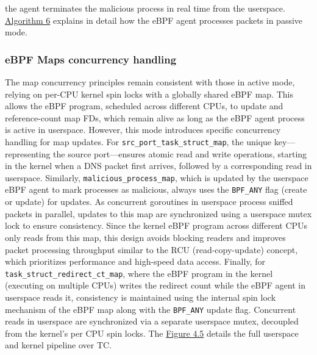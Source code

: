 \documentclass [11pt, proquest] {uwthesis}[2020/02/24]
\begin{document}
the agent terminates the malicious process in real time from the userspace. \hyperref[sec:alg6]{Algorithm 6} explains in detail how the eBPF agent processes packets in passive mode.

\subsubsection{\textbf{eBPF Maps concurrency handling}}
\label{passive:sec3}
The map concurrency principles remain consistent with those in active mode, relying on per-CPU kernel spin locks with a globally shared eBPF map. This allows the eBPF program, scheduled across different CPUs, to update and reference-count map FDs, which remain alive as long as the eBPF agent process is active in userspace. However, this mode introduces specific concurrency handling for map updates. For \texttt{src\_port\_task\_struct\_map}, the unique key—representing the source port—ensures atomic read and write operations, starting in the kernel when a DNS packet first arrives, followed by a corresponding read in userspace. Similarly, \texttt{malicious\_process\_map}, which is updated by the userspace eBPF agent to mark processes as malicious, always uses the \texttt{BPF\_ANY} flag (create or update) for updates. As concurrent goroutines in userspace process sniffed packets in parallel, updates to this map are synchronized using a userspace mutex lock to ensure consistency. Since the kernel eBPF program across different CPUs only reads from this map, this design avoids blocking readers and improves packet processing throughput similar to the RCU (read-copy-update) concept, which prioritizes performance and high-speed data access. Finally, for \texttt{task\_struct\_redirect\_ct\_map}, where the eBPF program in the kernel (executing on multiple CPUs) writes the redirect count while the eBPF agent in userspace reads it, consistency is maintained using the internal spin lock mechanism of the eBPF map along with the \texttt{BPF\_ANY} update flag. Concurrent reads in userspace are synchronized via a separate userspace mutex, decoupled from the kernel's per CPU spin locks. The \hyperref[sec:dp-passive-phase]{Figure 4.5} details the full userspace and kernel pipeline over TC. 
\end{document}
